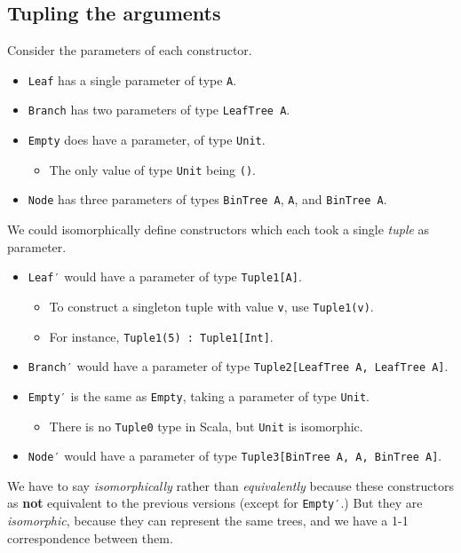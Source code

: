 \documentclass[11pt]{article}
\begin{document}
\subsection{Tupling the arguments}
\label{sec:orgfcb0bd0}
Consider the parameters of each constructor.
\begin{itemize}
\item \texttt{Leaf} has a single parameter of type \texttt{A}.
\item \texttt{Branch} has two parameters of type \texttt{LeafTree A}.
\item \texttt{Empty} does have a parameter, of type \texttt{Unit}.
\begin{itemize}
\item The only value of type \texttt{Unit} being \texttt{()}.
\end{itemize}
\item \texttt{Node} has three parameters of types \texttt{BinTree A}, \texttt{A}, and \texttt{BinTree A}.
\end{itemize}

We could isomorphically define constructors
which each took a single \emph{tuple} as parameter.
\begin{itemize}
\item \texttt{Leaf′} would have a parameter of type \texttt{Tuple1[A]}.
\begin{itemize}
\item To construct a singleton tuple with value \texttt{v}, use \texttt{Tuple1(v)}.
\item For instance, \texttt{Tuple1(5) : Tuple1[Int]}.
\end{itemize}
\item \texttt{Branch′} would have a parameter of type \texttt{Tuple2[LeafTree A, LeafTree A]}.
\item \texttt{Empty′} is the same as \texttt{Empty}, taking a parameter of type \texttt{Unit}.
\begin{itemize}
\item There is no \texttt{Tuple0} type in Scala, but \texttt{Unit} is isomorphic.
\end{itemize}
\item \texttt{Node′} would have a parameter of type \texttt{Tuple3[BinTree A, A, BinTree A]}.
\end{itemize}
We have to say \emph{isomorphically} rather than \emph{equivalently} because
these constructors as \textbf{not} equivalent to the previous versions
(except for \texttt{Empty′}.) But they are \emph{isomorphic}, because they can represent
the same trees, and we have a 1-1 correspondence between them.
\end{document}

